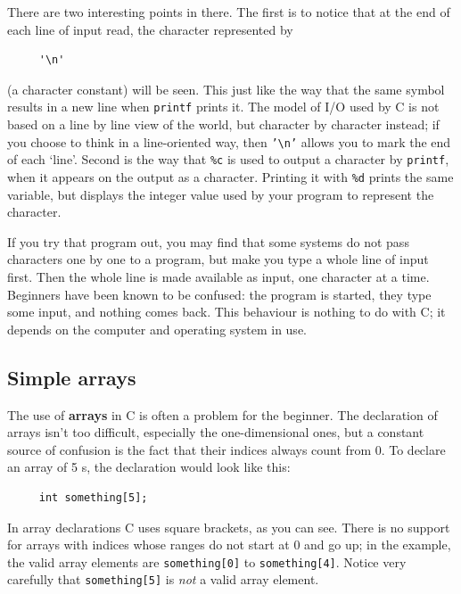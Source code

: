    There are two interesting points in there. The first is to notice that
   at the end of each line of input read, the character represented by
   \begin{Verbatim}
     '\n'
   \end{Verbatim}

   (a character constant) will be seen. This just like the way that the
    same symbol results in a new line when \texttt{printf} prints it. The
    model of I/O used by C is not based on a line by line view of the world,
    but character by character instead; if you choose to think in a
    line-oriented way, then \texttt{'\textbackslash n'} allows you to mark the end of
    each `line'. Second is the way that \texttt{\%c} is used to
    output a character by \texttt{printf}, when it appears on the output
    as a character. Printing it with \texttt{\%d} prints the same variable,
    but displays the integer value used by your program to represent the
    character.


   If you try that program out, you may find that some systems do not pass
    characters one by one to a program, but make you type a whole line of
    input first. Then the whole line is made available as input, one character
    at a time. Beginners have been known to be confused: the program is
    started, they type some input, and nothing comes back. This behaviour is
    nothing to do with C; it depends on the computer and operating system in
    use.


  

  \subsection{Simple arrays}
   

   The use of \textbf{arrays} in C is often a problem for the beginner.
    The declaration of arrays isn't too difficult, especially the
    one-dimensional ones, but a constant source of confusion is the fact
    that their indices always count from 0. To declare an array of
    5 \kint{}s, the declaration would look like this:


   \begin{Verbatim}
     int something[5];
   \end{Verbatim}

   In array declarations C uses square brackets, as you can see. There is
    no support for arrays with indices whose ranges do not start at 0 and go
    up; in the example, the valid array elements are \texttt{something[0]}
    to \texttt{something[4]}. Notice very carefully that
    \texttt{something[5]} is \textit{not} a valid array element.


